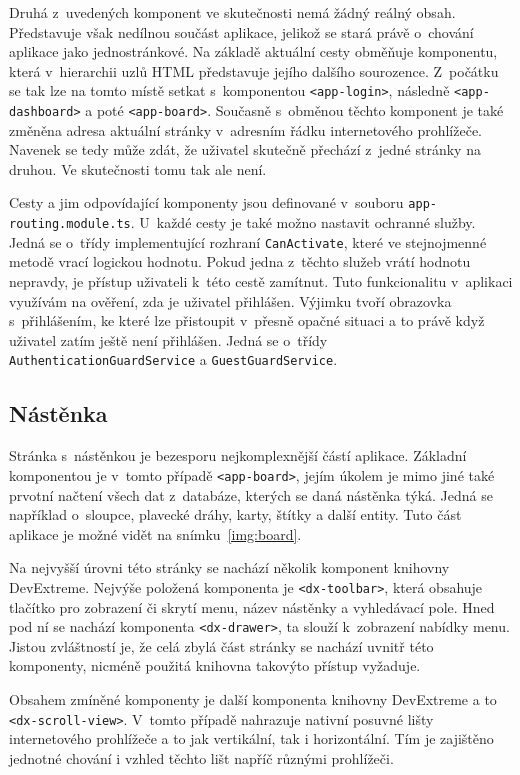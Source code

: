 Druhá z~uvedených komponent ve skutečnosti nemá žádný reálný obsah. Představuje však nedílnou součást aplikace, jelikož se stará právě o~chování aplikace jako jednostránkové. Na základě aktuální cesty obměňuje komponentu, která v~hierarchii uzlů HTML představuje jejího dalšího sourozence. Z~počátku se tak lze na tomto místě setkat s~komponentou \texttt{<app-login>}, následně \texttt{<app-dashboard>} a poté \texttt{<app-board>}. Současně s~obměnou těchto komponent je také změněna adresa aktuální stránky v~adresním řádku internetového prohlížeče. Navenek se tedy může zdát, že uživatel skutečně přechází z~jedné stránky na druhou. Ve skutečnosti tomu tak ale není.

Cesty a jim odpovídající komponenty jsou definované v~souboru \texttt{app-routing.module.ts}. U~každé cesty je také možno nastavit ochranné služby. Jedná se o~třídy implementující rozhraní \texttt{CanActivate}, které ve stejnojmenné metodě vrací logickou hodnotu. Pokud jedna z~těchto služeb vrátí hodnotu nepravdy, je přístup uživateli k~této cestě zamítnut. Tuto funkcionalitu v~aplikaci využívám na ověření, zda je uživatel přihlášen. Výjimku tvoří obrazovka s~přihlášením, ke které lze přistoupit v~přesně opačné situaci a to právě když uživatel zatím ještě není přihlášen. Jedná se o~třídy \texttt{AuthenticationGuardService} a \texttt{GuestGuardService}.


\subsection{Nástěnka}
Stránka s~nástěnkou je bezesporu nejkomplexnější částí aplikace. Základní komponentou je v~tomto případě \texttt{<app-board>}, jejím úkolem je mimo jiné také prvotní načtení všech dat z~databáze, kterých se daná nástěnka týká. Jedná se například o~sloupce, plavecké dráhy, karty, štítky a další entity. Tuto část aplikace je možné vidět na snímku~\ref{img:board}.

Na nejvyšší úrovni této stránky se nachází několik komponent knihovny DevExtreme. Nejvýše položená komponenta je \texttt{<dx-toolbar>}, která obsahuje tlačítko pro zobrazení či skrytí menu, název nástěnky a vyhledávací pole. Hned pod ní se nachází komponenta \texttt{<dx-drawer>}, ta slouží k~zobrazení nabídky menu. Jistou zvláštností je, že celá zbylá část stránky se nachází uvnitř této komponenty, nicméně použitá knihovna takovýto přístup vyžaduje.

Obsahem zmíněné komponenty je další komponenta knihovny DevExtreme a to \texttt{<dx-scroll-view>}. V~tomto případě nahrazuje nativní posuvné lišty internetového prohlížeče a to jak vertikální, tak i horizontální. Tím je zajištěno jednotné chování i vzhled těchto lišt napříč různými prohlížeči.

